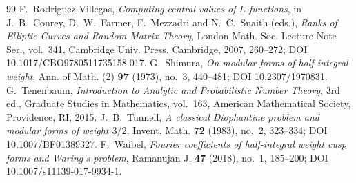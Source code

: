 \documentclass[10pt,a4paper]{amsart}
\begin{document}
\begin{thebibliography}{99}
 F.~Rodriguez-Villegas, \emph{Computing central values of $L$-functions}, in J.~B.~Conrey, D.~W.~Farmer, F.~Mezzadri and N.~C.~Snaith (eds.), \emph{Ranks of Elliptic Curves and Random Matrix Theory}, London Math. Soc. Lecture Note Ser., vol.~341, Cambridge Univ. Press, Cambridge, 2007, 260--272; DOI 10.1017/CBO9780511735158.017.
 G.~Shimura, \emph{On modular forms of half integral weight}, Ann. of Math. (2) \textbf{97} (1973), no.~3, 440--481; DOI 10.2307/1970831.
 G.~Tenenbaum, \emph{Introduction to Analytic and Probabilistic Number Theory}, 3rd ed., Graduate Studies in Mathematics, vol.~163, American Mathematical Society, Providence, RI, 2015.
 J.~B.~Tunnell, \emph{A classical Diophantine problem and modular forms of weight $3/2$}, Invent. Math. \textbf{72} (1983), no.~2, 323--334; DOI 10.1007/BF01389327.
 F.~Waibel, \emph{Fourier coefficients of half-integral weight cusp forms and Waring's problem}, Ramanujan J. \textbf{47} (2018), no.~1, 185--200; DOI 10.1007/s11139-017-9934-1.
\end{thebibliography}
\end{document}
